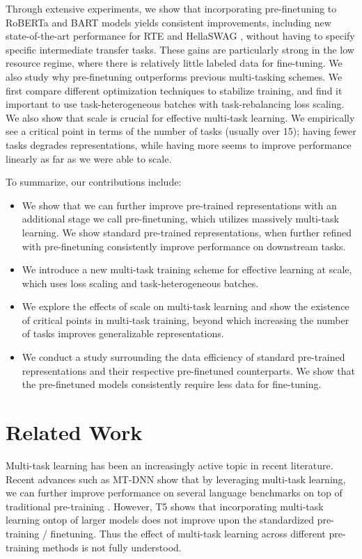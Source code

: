 \documentclass[11pt,a4paper]{article}
\begin{document}
Through extensive experiments, we show that incorporating pre-finetuning to RoBERTa \cite{ROBERTA} and BART \cite{BART} models yields consistent improvements, including new state-of-the-art performance for RTE \cite{rte} and HellaSWAG \cite{hellaswag}, without having to specify specific intermediate transfer tasks. These gains are particularly strong in the low resource regime, where there is relatively little labeled data for fine-tuning.  
We also study why pre-finetuning outperforms previous multi-tasking schemes. We first compare different optimization techniques to stabilize training, and find it important to use task-heterogeneous batches with task-rebalancing loss scaling. We also show that scale is crucial for effective multi-task learning.
We empirically see a critical point in terms of the number of tasks (usually over 15); having fewer tasks degrades representations, while having more seems to improve performance linearly as far as we were able to scale.

To summarize, our contributions include:
\begin{itemize}
    \item We show that we can further improve pre-trained representations with an additional stage we call pre-finetuning, which utilizes massively multi-task learning. We show standard pre-trained representations, when further refined with pre-finetuning consistently improve performance on downstream tasks.
    \item We introduce a new multi-task training scheme for effective learning at scale, which uses loss scaling and task-heterogeneous batches.
    \item We explore the effects of scale on multi-task learning and show the existence of critical points in multi-task training, beyond which increasing the number of tasks improves generalizable representations.
    \item We conduct a study surrounding the data efficiency of standard pre-trained representations and their respective pre-finetuned counterparts. We show that the pre-finetuned models consistently require less data for fine-tuning.
\end{itemize}
\section{Related Work}
Multi-task learning has been an increasingly active topic in recent literature. Recent advances such as MT-DNN show that by leveraging multi-task learning, we can further improve performance on several language benchmarks on top of traditional pre-training \citep{MT_DNN}. However, T5 \citep{T5} shows that incorporating multi-task learning ontop of larger models does not improve upon the standardized pre-training / finetuning. Thus the effect of multi-task learning across different pre-training methods is not fully understood. 
\end{document}
